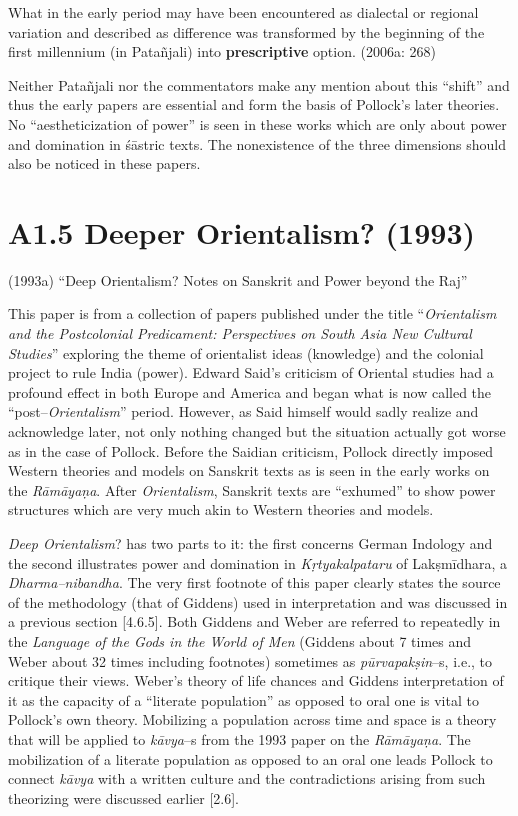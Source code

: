 \begin{myquote}
What in the early period may have been encountered as dialectal or regional variation and described as difference was transformed by the beginning of the ﬁrst millennium (in Patañjali) into \textbf{prescriptive} option. (2006a: 268)
\end{myquote}

Neither Patañjali nor the commentators make any mention about this “shift” and thus the early papers are essential and form the basis of Pollock’s later theories. No “aestheticization of power” is seen in these works which are only about power and domination in śāstric texts. The nonexistence of the three dimensions should also be noticed in these papers.

\vspace{-.5cm}

\section*{A1.5 Deeper Orientalism? (1993)}

(1993a) “Deep Orientalism? Notes on Sanskrit and Power beyond the Raj”

\newpage

This paper is from a collection of papers published under the title “\textit{Orientalism and the Postcolonial Predicament: Perspectives on South Asia New Cultural Studies}” exploring the theme of orientalist ideas (knowledge) and the colonial project to rule India (power). Edward Said’s criticism of Oriental studies had a profound effect in both Europe and America and began what is now called the “post–\textit{Orientalism}” period. However, as Said himself would sadly realize and acknowledge later, not only nothing changed but the situation actually got worse as in the case of Pollock. Before the Saidian criticism, Pollock directly imposed Western theories and models on Sanskrit texts as is seen in the early works on the \textit{Rāmāyaṇa}. After \textit{Orientalism}, Sanskrit texts are “exhumed” to show power structures which are very much akin to Western theories and models.

\textit{Deep Orientalism}? has two parts to it: the first concerns German Indology and the second illustrates power and domination in \textit{Kṛtyakalpataru} of Lakṣmīdhara, a \textit{Dharma–nibandha}. The very first footnote of this paper clearly states the source of the methodology (that of Giddens) used in interpretation and was discussed in a previous section [4.6.5]. Both Giddens and Weber are referred to repeatedly in the \textit{Language of the Gods in the World of Men }(Giddens about 7 times and Weber about 32 times including footnotes) sometimes as \textit{pūrvapakṣin}–s, i.e., to critique their views. Weber’s theory of life chances and Giddens interpretation of it as the capacity of a “literate population” as opposed to oral one is vital to Pollock’s own theory. Mobilizing a population across time and space is a theory that will be applied to \textit{kāvya}–s from the 1993 paper on the\textit{ Rāmāyaṇa}. The mobilization of a literate population as opposed to an oral one leads Pollock to connect \textit{kāvya} with a written culture and the contradictions arising from such theorizing were discussed earlier [2.6].

